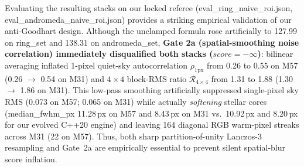 \documentclass[10pt,twocolumn,letterpaper]{article}
\DeclareRobustCommand{\code}[1]{\texttt{#1}}
\def\code#1{#1}%
\begin{document}
Evaluating the resulting stacks on our locked referee (\code{eval\_ring\_naive\_roi.json}, \code{eval\_andromeda\_naive\_roi.json}) provides a striking empirical validation of our anti-Goodhart design. Although the unclamped formula rose artificially to \code{127.99} on \code{ring\_set} and \code{138.31} on \code{andromeda\_set}, \textbf{Gate 2a (spatial-smoothing noise correlation) immediately disqualified both stacks ($\code{score} = -\infty$)}: bilinear averaging inflated 1-pixel quiet-sky autocorrelation $\rho_{1\text{px}}$ from \code{0.26} to \code{0.55} on M57 (\code{0.26} $\to$ \code{0.54} on M31) and $4\times 4$ block-RMS ratio $\mathcal{R}_{4\times 4}$ from \code{1.31} to \code{1.88} (\code{1.30} $\to$ \code{1.86} on M31). This low-pass smoothing artificially suppressed single-pixel sky RMS (\code{0.073} on M57; \code{0.065} on M31) while actually \emph{softening} stellar cores (\code{median\_fwhm\_px} \code{11.28\,px} on M57 and \code{8.43\,px} on M31 vs.\ \code{10.92\,px} and \code{8.20\,px} for our evolved C++20 engine) and leaving \code{164} diagonal RGB warm-pixel streaks across M31 (\code{22} on M57). Thus, both sharp partition-of-unity Lanczos-3 resampling and Gate~2a are empirically essential to prevent silent spatial-blur score inflation.
\end{document}
